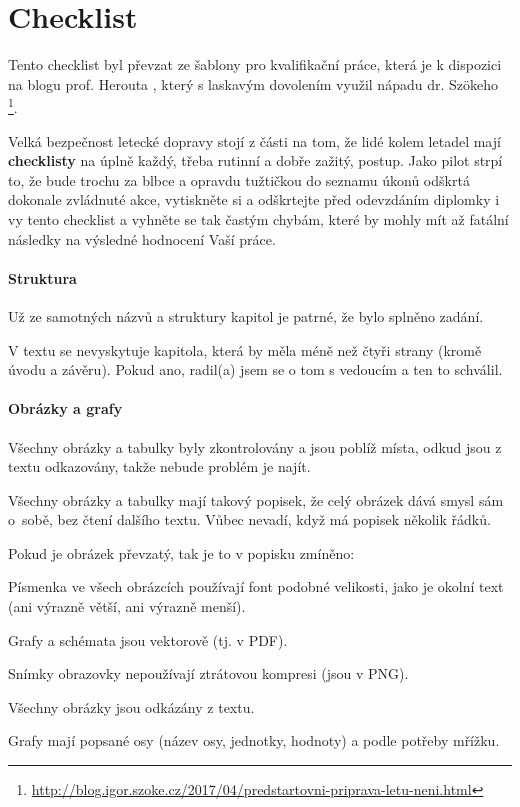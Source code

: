 \chapter{Checklist} 
\label{checklist}
Tento checklist byl převzat ze šablony pro kvalifikační práce, která je k dispozici na blogu prof. Herouta \cite{Herout}, který s laskavým dovolením využil nápadu dr. Szökeho%
\footnote{\url{http://blog.igor.szoke.cz/2017/04/predstartovni-priprava-letu-neni.html}}. 

Velká bezpečnost letecké dopravy stojí z části na tom, že lidé kolem letadel mají \textbf{checklisty} na úplně každý, třeba rutinní a dobře zažitý, postup. Jako pilot strpí to, že bude trochu za blbce a opravdu tužtičkou do seznamu úkonů odškrtá dokonale zvládnuté akce, vytiskněte si a odškrtejte před odevzdáním diplomky i vy tento checklist a vyhněte se tak častým chybám, které by mohly mít až fatální následky na výsledné hodnocení Vaší práce.

\subsubsection*{Struktura}
\begin{checklist}
	\item Už ze samotných názvů a struktury kapitol je patrné, že bylo splněno zadání.
	\item V textu se nevyskytuje kapitola, která by měla méně než čtyři strany (kromě úvodu a závěru). Pokud ano, radil(a) jsem se o tom s vedoucím a ten to schválil.
\end{checklist}

\subsubsection*{Obrázky a grafy}
\begin{checklist}
	\item Všechny obrázky a tabulky byly zkontrolovány a jsou poblíž místa, odkud jsou z textu odkazovány, takže nebude problém je najít.
	\item Všechny obrázky a tabulky mají takový popisek, že celý obrázek dává smysl sám o~sobě, bez čtení dalšího textu. Vůbec nevadí, když má popisek několik řádků.
	\item Pokud je obrázek převzatý, tak je to v popisku zmíněno: 
	\item Písmenka ve všech obrázcích používají font podobné velikosti, jako je okolní text (ani výrazně větší, ani výrazně menší).
	\item Grafy a schémata jsou vektorově (tj. v PDF).
	\item Snímky obrazovky nepoužívají ztrátovou kompresi (jsou v PNG).
	\item Všechny obrázky jsou odkázány z textu.
	\item Grafy mají popsané osy (název osy, jednotky, hodnoty) a podle potřeby mřížku.
\end{checklist}

